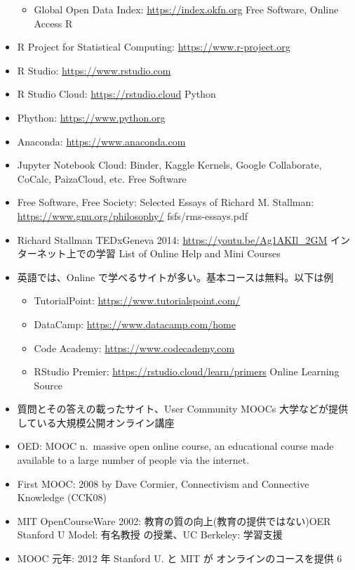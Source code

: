 \documentclass[
]{book}
\providecommand{\tightlist}{%
  \setlength{\itemsep}{0pt}\setlength{\parskip}{0pt}}
\theoremstyle{definition}
\theoremstyle{definition}
\theoremstyle{definition}
\theoremstyle{definition}
\theoremstyle{remark}
\begin{document}
\begin{itemize}
  \begin{itemize}
  \tightlist
  \item
    Global Open Data Index: \url{https://index.okfn.org}
    Free Software, Online Access R
  \end{itemize}
\item
  R Project for Statistical Computing: \url{https://www.r-project.org}
\item
  R Studio: \url{https://www.rstudio.com}
\item
  R Studio Cloud: \url{https://rstudio.cloud}
  Python
\item
  Phython: \url{https://www.python.org}
\item
  Anaconda: \url{https://www.anaconda.com}
\item
  Jupyter Notebook Cloud: Binder, Kaggle Kernels, Google Collaborate, CoCalc, PaizaCloud, etc.
  Free Software
\item
  Free Software, Free Society: Selected Essays of Richard M. Stallman: \url{https://www.gnu.org/philosophy/} fsfs/rms-essays.pdf
\item
  Richard Stallman TEDxGeneva 2014: \url{https://youtu.be/Ag1AKIl_2GM}
  インターネット上での学習
  List of Online Help and Mini Courses
\item
  英語では、Online で学べるサイトが多い。基本コースは無料。以下は例

  \begin{itemize}
  \tightlist
  \item
    TutorialPoint: \url{https://www.tutorialspoint.com/}
  \item
    DataCamp: \url{https://www.datacamp.com/home}
  \item
    Code Academy: \url{https://www.codecademy.com}
  \item
    RStudio Premier: \url{https://rstudio.cloud/learn/primers}
    Online Learning Source
  \end{itemize}
\item
  質問とその答えの載ったサイト、User Community
  MOOCs 大学などが提供している大規模公開オンライン講座
\item
  OED: MOOC n.~massive open online course, an educational course made available to a large number of people via the internet.
\item
  First MOOC: 2008 by Dave Cormier, Connectivism and Connective Knowledge (CCK08)
\item
  MIT OpenCourseWare 2002: 教育の質の向上(教育の提供ではない)OER Stanford U Model: 有名教授
  の授業、UC Berkeley: 学習支援
\item
  MOOC 元年: 2012 年 Stanford U. と MIT が オンラインのコースを提供
  6
\end{itemize}
\end{document}
